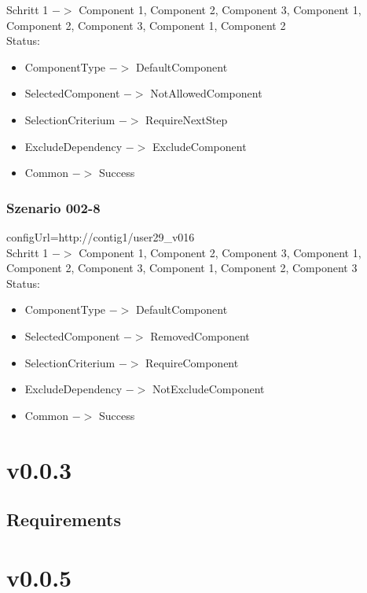 \documentclass{article}
\begin{document}
\noindent Schritt 1 $->$ Component 1, Component 2, Component 3, Component 1,
Component 2, Component 3, Component 1, Component 2\\

\noindent Status:

\begin{itemize}
  \item ComponentType $->$ DefaultComponent
  \item SelectedComponent $->$ NotAllowedComponent
  \item SelectionCriterium $->$ RequireNextStep
  \item ExcludeDependency $->$ ExcludeComponent
  \item Common $->$ Success
\end{itemize}

\subsubsection{Szenario 002-8}

configUrl=http://contig1/user29\_v016\\

\noindent Schritt 1 $->$ Component 1, Component 2, Component 3, Component 1,
Component 2, Component 3, Component 1, Component 2, Component 3\\

\noindent Status:

\begin{itemize}
  \item ComponentType $->$ DefaultComponent
  \item SelectedComponent $->$ RemovedComponent
  \item SelectionCriterium $->$ RequireComponent
  \item ExcludeDependency $->$ NotExcludeComponent
  \item Common $->$ Success
\end{itemize}

\section{v0.0.3}

\subsection{Requirements}

\section{v0.0.5}
\end{document}
